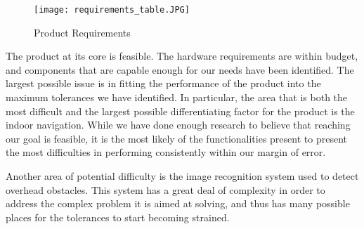 \documentclass[letterpaper,12pt]{article}
\begin{document}
\begin{figure}[h]
\centering
\caption{Product Requirements}
\texttt{[image: requirements\_table.JPG]}
\end{figure}

The product at its core is feasible. The hardware requirements are within budget, and components that are capable enough for our needs have been identified. The largest possible issue is in fitting the performance of the product into the maximum tolerances we have identified. In particular, the area that is both the most difficult and the largest possible differentiating factor for the product is the indoor navigation. While we have done enough research to believe that reaching our goal is feasible, it is the most likely of the functionalities present to present the most difficulties in performing consistently within our margin of error.\par

Another area of potential difficulty is the image recognition system used to detect overhead obstacles. This system has a great deal of complexity in order to address the complex problem it is aimed at solving, and thus has many possible places for the tolerances to start becoming strained.\par

\end{document}
